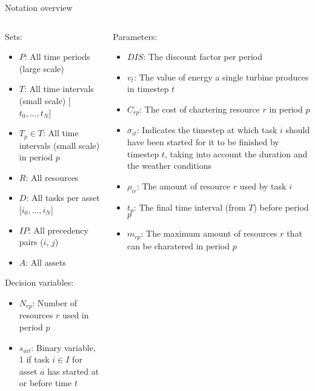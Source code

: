 \documentclass{beamer}
\begin{document}
\begin{frame}{Notation overview}
\scriptsize

\begin{columns}
\begin{column}{.48\textwidth}
Sets:
\begin{itemize}
\item $P$: All time periods (large scale)
\item $T$: All time intervals (small scale) [$t_0, \dots , t_N$]
\item $T_p \in T$: All time intervals (small scale) in period $p$
\item $R$: All resources
\item $D$:  All tasks per asset [$i_0, \dots , i_N$]
\item $IP$: All precedency pairs ($i$, $j$)
\item $A$: All assets
\end{itemize}

Decision variables:
\begin{itemize}
\item $N_{rp}$: Number of resources $r$ used in period $p$
\item $s_{ait}$: Binary variable, 1 if task $i \in I$ for asset $a$ has started at or before time $t$
\end{itemize}
\end{column}

\hfill

\begin{column}{.48\textwidth}
Parameters:
\begin{itemize}
\item $DIS$: The discount factor per period
\item $v_t$: The value of energy a single turbine produces in timestep $t$
\item $C_{rp}$: The cost of chartering resource $r$ in period $p$
\item $\sigma_{it}$: Indicates the timestep at which task $i$ should have been started for it to be finished by timestep $t$, taking into account the duration and the weather conditions
\item $\rho_{ir}$: The amount of resource $r$ used by task $i$
\item $t_p$: The final time interval (from $T$) before period $p$
\item $m_{rp}$: The maximum amount of resources $r$ that can be charatered in period $p$
\end{itemize}
\end{column}
\end{columns}

\end{frame}
\end{document}
